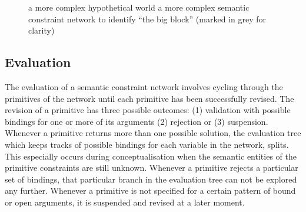 \begin{figure}[htbp]
\centering
{}
\caption[Example semantic constraint network for ``the big
block'']{ a more complex hypothetical
  world  a more complex semantic
  constraint network to identify ``the big block'' (marked in grey for
  clarity)}
\label{f:more-complex-context-and-network}
\end{figure}

\subsection{Evaluation}

The evaluation of a semantic constraint network involves cycling
through the primitives of the network until each primitive has been
successfully revised. The revision of a primitive has three possible
outcomes: (1) validation with possible bindings for one or more of its
arguments (2) rejection or (3) suspension. Whenever a primitive
returns more than one possible solution, the evaluation tree which
keeps tracks of possible bindings for each variable in the network,
splits. This especially occurs during conceptualisation when the
semantic entities of the primitive constraints are still
unknown. Whenever a primitive rejects a particular set of bindings,
that particular branch in the evaluation tree can not be explored any
further. Whenever a primitive is not specified for a certain pattern
of bound or open arguments, it is suspended and revised at a later
moment.

